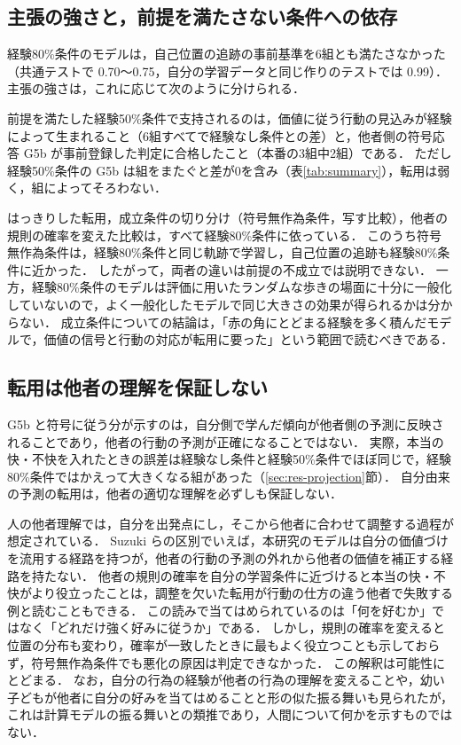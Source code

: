 \subsection{主張の強さと，前提を満たさない条件への依存}\label{sec:disc-strength}
経験80\%条件のモデルは，自己位置の追跡の事前基準を6組とも満たさなかった（共通テストで 0.70〜0.75，自分の学習データと同じ作りのテストでは 0.99）．
主張の強さは，これに応じて次のように分けられる．

前提を満たした経験50\%条件で支持されるのは，価値に従う行動の見込みが経験によって生まれること（6組すべてで経験なし条件との差）と，他者側の符号応答 G5b が事前登録した判定に合格したこと（本番の3組中2組）である．
ただし経験50\%条件の G5b は組をまたぐと差が0を含み（表\ref{tab:summary}），転用は弱く，組によってそろわない．

はっきりした転用，成立条件の切り分け（符号無作為条件，写す比較），他者の規則の確率を変えた比較は，すべて経験80\%条件に依っている．
このうち符号無作為条件は，経験80\%条件と同じ軌跡で学習し，自己位置の追跡も経験80\%条件に近かった．
したがって，両者の違いは前提の不成立では説明できない．
一方，経験80\%条件のモデルは評価に用いたランダムな歩きの場面に十分に一般化していないので，よく一般化したモデルで同じ大きさの効果が得られるかは分からない．
成立条件についての結論は，「赤の角にとどまる経験を多く積んだモデルで，価値の信号と行動の対応が転用に要った」という範囲で読むべきである．

\subsection{転用は他者の理解を保証しない}\label{sec:disc-st}
G5b と符号に従う分が示すのは，自分側で学んだ傾向が他者側の予測に反映されることであり，他者の行動の予測が正確になることではない．
実際，本当の快・不快を入れたときの誤差は経験なし条件と経験50\%条件でほぼ同じで，経験80\%条件ではかえって大きくなる組があった（\ref{sec:res-projection}節）．
自分由来の予測の転用は，他者の適切な理解を必ずしも保証しない．

人の他者理解では，自分を出発点にし，そこから他者に合わせて調整する過程が想定されている\cite{epley2004perspective,tamir2010neural}．
Suzuki ら\cite{suzuki2012learning}の区別でいえば，本研究のモデルは自分の価値づけを流用する経路を持つが，他者の行動の予測の外れから他者の価値を補正する経路を持たない．
他者の規則の確率を自分の学習条件に近づけると本当の快・不快がより役立ったことは，調整を欠いた転用が行動の仕方の違う他者で失敗する例と読むこともできる．
この読みで当てはめられているのは「何を好むか」ではなく「どれだけ強く好みに従うか」である．
しかし，規則の確率を変えると位置の分布も変わり，確率が一致したときに最もよく役立つことも示しておらず，符号無作為条件でも悪化の原因は判定できなかった．
この解釈は可能性にとどまる．
なお，自分の行為の経験が他者の行為の理解を変えること\cite{sommerville2005action}や，幼い子どもが他者に自分の好みを当てはめること\cite{repacholi1997early}と形の似た振る舞いも見られたが，これは計算モデルの振る舞いとの類推であり，人間について何かを示すものではない．

